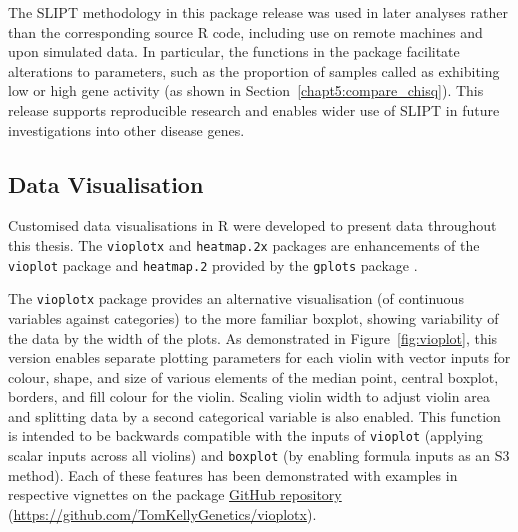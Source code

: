 The \gls{SLIPT} methodology in this package release was used in later analyses rather than the corresponding source R code, including use on remote machines and upon simulated data. In particular, the functions in the package facilitate alterations to parameters, such as the proportion of samples called as exhibiting low or high gene activity (as shown in Section~\ref{chapt5:compare_chisq}). This release supports reproducible research and enables wider use of \gls{SLIPT} in future investigations into other disease genes.

\subsection{Data Visualisation} \label{methods:r_packages_vis}
Customised data visualisations in R \citep{R_core} were developed to present data throughout this thesis. The \texttt{vioplotx} and \texttt{heatmap.2x} packages are enhancements of the \texttt{vioplot} package \citep{vioplot} and \texttt{heatmap.2} provided by the \texttt{gplots} package \citep{gplots}. 

The \texttt{vioplotx} package provides an alternative visualisation (of continuous variables against categories) to the more familiar boxplot, showing variability of the data by the width of the plots. As demonstrated in Figure~\ref{fig:vioplot}, this version enables separate plotting parameters for each violin with vector inputs for colour, shape, and size of various elements of the median point, central boxplot, borders, and fill colour for the violin. Scaling violin width to adjust violin area and splitting data by a second categorical variable is also enabled. This function is intended to be backwards compatible with the inputs of \texttt{vioplot} (applying scalar inputs across all violins) and \texttt{boxplot} (by enabling formula inputs as an S3 method). Each of these features has been demonstrated with examples in respective vignettes on the package \href{https://github.com/TomKellyGenetics/vioplotx}{GitHub repository} (\url{https://github.com/TomKellyGenetics/vioplotx}).

